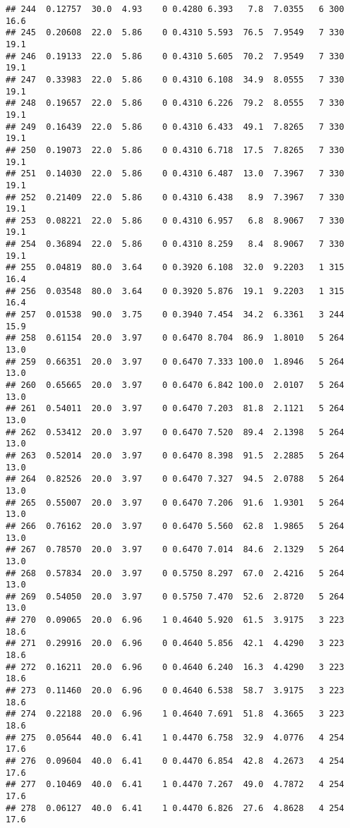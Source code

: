 \documentclass[]{article}
\begin{document}
\begin{verbatim}
## 244  0.12757  30.0  4.93    0 0.4280 6.393   7.8  7.0355   6 300    16.6
## 245  0.20608  22.0  5.86    0 0.4310 5.593  76.5  7.9549   7 330    19.1
## 246  0.19133  22.0  5.86    0 0.4310 5.605  70.2  7.9549   7 330    19.1
## 247  0.33983  22.0  5.86    0 0.4310 6.108  34.9  8.0555   7 330    19.1
## 248  0.19657  22.0  5.86    0 0.4310 6.226  79.2  8.0555   7 330    19.1
## 249  0.16439  22.0  5.86    0 0.4310 6.433  49.1  7.8265   7 330    19.1
## 250  0.19073  22.0  5.86    0 0.4310 6.718  17.5  7.8265   7 330    19.1
## 251  0.14030  22.0  5.86    0 0.4310 6.487  13.0  7.3967   7 330    19.1
## 252  0.21409  22.0  5.86    0 0.4310 6.438   8.9  7.3967   7 330    19.1
## 253  0.08221  22.0  5.86    0 0.4310 6.957   6.8  8.9067   7 330    19.1
## 254  0.36894  22.0  5.86    0 0.4310 8.259   8.4  8.9067   7 330    19.1
## 255  0.04819  80.0  3.64    0 0.3920 6.108  32.0  9.2203   1 315    16.4
## 256  0.03548  80.0  3.64    0 0.3920 5.876  19.1  9.2203   1 315    16.4
## 257  0.01538  90.0  3.75    0 0.3940 7.454  34.2  6.3361   3 244    15.9
## 258  0.61154  20.0  3.97    0 0.6470 8.704  86.9  1.8010   5 264    13.0
## 259  0.66351  20.0  3.97    0 0.6470 7.333 100.0  1.8946   5 264    13.0
## 260  0.65665  20.0  3.97    0 0.6470 6.842 100.0  2.0107   5 264    13.0
## 261  0.54011  20.0  3.97    0 0.6470 7.203  81.8  2.1121   5 264    13.0
## 262  0.53412  20.0  3.97    0 0.6470 7.520  89.4  2.1398   5 264    13.0
## 263  0.52014  20.0  3.97    0 0.6470 8.398  91.5  2.2885   5 264    13.0
## 264  0.82526  20.0  3.97    0 0.6470 7.327  94.5  2.0788   5 264    13.0
## 265  0.55007  20.0  3.97    0 0.6470 7.206  91.6  1.9301   5 264    13.0
## 266  0.76162  20.0  3.97    0 0.6470 5.560  62.8  1.9865   5 264    13.0
## 267  0.78570  20.0  3.97    0 0.6470 7.014  84.6  2.1329   5 264    13.0
## 268  0.57834  20.0  3.97    0 0.5750 8.297  67.0  2.4216   5 264    13.0
## 269  0.54050  20.0  3.97    0 0.5750 7.470  52.6  2.8720   5 264    13.0
## 270  0.09065  20.0  6.96    1 0.4640 5.920  61.5  3.9175   3 223    18.6
## 271  0.29916  20.0  6.96    0 0.4640 5.856  42.1  4.4290   3 223    18.6
## 272  0.16211  20.0  6.96    0 0.4640 6.240  16.3  4.4290   3 223    18.6
## 273  0.11460  20.0  6.96    0 0.4640 6.538  58.7  3.9175   3 223    18.6
## 274  0.22188  20.0  6.96    1 0.4640 7.691  51.8  4.3665   3 223    18.6
## 275  0.05644  40.0  6.41    1 0.4470 6.758  32.9  4.0776   4 254    17.6
## 276  0.09604  40.0  6.41    0 0.4470 6.854  42.8  4.2673   4 254    17.6
## 277  0.10469  40.0  6.41    1 0.4470 7.267  49.0  4.7872   4 254    17.6
## 278  0.06127  40.0  6.41    1 0.4470 6.826  27.6  4.8628   4 254    17.6

\end{verbatim}
\end{document}
